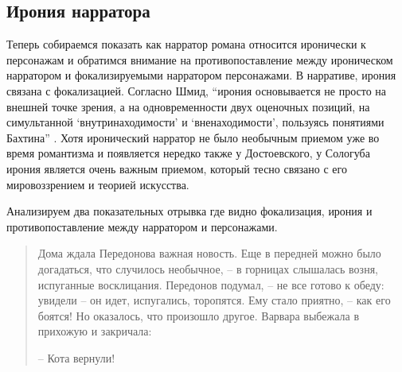 \documentclass[12pt,a4paper]{article}
\begin{document}




\subsection{Ирония нарратора}



Теперь собираемся показать как нарратор романа относится иронически к персонажам и обратимся внимание на противопоставление между ироническом нарратором и фокализируемыми нарратором персонажами. В нарративе, ирония связана с фокализацией. Согласно Шмид, \enquote{ирония основывается не просто на внешней точке зрения, а на одновременности двух оценочных позиций, на симультанной \enquote{внутринаходимости} и \enquote{вненаходимости}, пользуясь понятиями Бахтина} \parencite[118]{schmid2008}.  Хотя иронический нарратор не было необычным приемом уже во время романтизма и появляется нередко также у Достоевского, у Сологуба ирония является очень важным приемом, который тесно связано с его мировоззрением и теорией искусства.

Анализируем два показательных отрывка где видно фокализация, ирония и противопоставление между нарратором и персонажами.

\begin{quote}
Дома ждала Передонова важная новость. Еще в передней можно
было догадаться, что случилось необычное, – в горницах слышалась 
возня, испуганные восклицания. Передонов подумал, – не все
готово к обеду: увидели – он идет, испугались, торопятся. Ему стало
приятно, – как его боятся! Но оказалось, что произошло другое. 
Варвара выбежала в прихожую и закричала:

– Кота вернули!

\parencite[171.]{sologub2004}

\end{quote}
\end{document}
